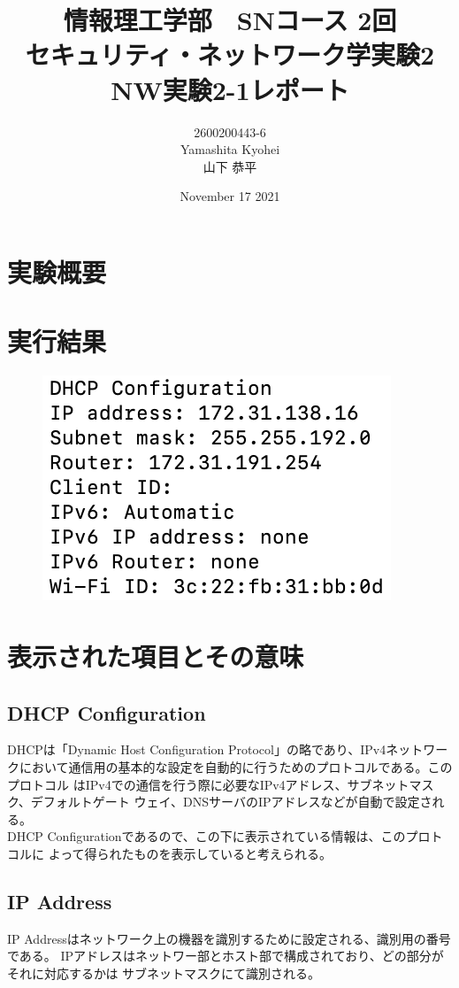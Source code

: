 \documentclass[dvipdfmx,autodetect-engine,titlepage]{jsarticle}
\title{情報理工学部　SNコース 2回\\
セキュリティ・ネットワーク学実験2\\
NW実験2-1レポート}
\author{2600200443-6\\Yamashita Kyohei\\山下 恭平}
\date{November 17 2021}
\begin{document}
\maketitle

\section{実験概要}

\section{実行結果}
\begin{figure}[h]
  \centering
  \includegraphics[scale=1]{SS1.png}
\end{figure}

\section{表示された項目とその意味}

 \subsection{DHCP Configuration}
 DHCPは「Dynamic Host Configuration Protocol」の略であり、IPv4ネットワー
 クにおいて通信用の基本的な設定を自動的に行うためのプロトコルである。このプロトコル
 はIPv4での通信を行う際に必要なIPv4アドレス、サブネットマスク、デフォルトゲート
 ウェイ、DNSサーバのIPアドレスなどが自動で設定される。\\
 DHCP Configurationであるので、この下に表示されている情報は、このプロトコルに
 よって得られたものを表示していると考えられる。

 \subsection{IP Address}
 IP Addressはネットワーク上の機器を識別するために設定される、識別用の番号である。
 IPアドレスはネットワー部とホスト部で構成されており、どの部分がそれに対応するかは
 サブネットマスクにて識別される。
\end{document}
